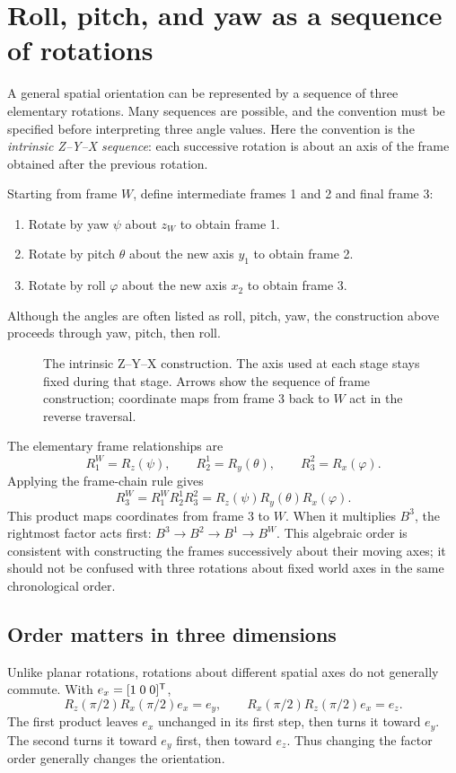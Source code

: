 \section{Roll, pitch, and yaw as a sequence of rotations}
A general spatial orientation can be represented by a sequence of three
elementary rotations. Many sequences are possible, and the convention must
be specified before interpreting three angle values. Here the convention is
the \emph{intrinsic Z--Y--X sequence}: each successive rotation is about an
axis of the frame obtained after the previous rotation.

Starting from frame $W$, define intermediate frames 1 and 2 and final frame 3:
\begin{enumerate}
 \item Rotate by yaw $\psi$ about $z_W$ to obtain frame 1.
 \item Rotate by pitch $\theta$ about the new axis $y_1$ to obtain frame 2.
 \item Rotate by roll $\varphi$ about the new axis $x_2$ to obtain frame 3.
\end{enumerate}
Although the angles are often listed as roll, pitch, yaw, the construction
above proceeds through yaw, pitch, then roll.

\begin{figure}[htbp]
\centering
\caption{The intrinsic Z--Y--X construction. The axis used at each stage stays
fixed during that stage. Arrows show the sequence of frame construction;
coordinate maps from frame 3 back to $W$ act in the reverse traversal.}
\label{fig:l04-sequence}
\end{figure}

The elementary frame relationships are
\[
 R_1^W=R_z(\psi),\qquad R_2^1=R_y(\theta),\qquad R_3^2=R_x(\varphi).
\]
Applying the frame-chain rule gives
\begin{equation}
 \boxed{R_3^W=R_1^W R_2^1 R_3^2
 =R_z(\psi)R_y(\theta)R_x(\varphi).}
 \label{eq:l04-rpy}
\end{equation}
This product maps coordinates from frame 3 to $W$. When it multiplies $B^3$,
the rightmost factor acts first: $B^3\to B^2\to B^1\to B^W$. This algebraic
order is consistent with constructing the frames successively about their
moving axes; it should not be confused with three rotations about fixed world
axes in the same chronological order.

\subsection{Order matters in three dimensions}
Unlike planar rotations, rotations about different spatial axes do not
generally commute. With $e_x=[1\;0\;0]^{\mathsf T}$,
\[
 R_z(\pi/2)R_x(\pi/2)e_x=e_y,\qquad
 R_x(\pi/2)R_z(\pi/2)e_x=e_z.
\]
The first product leaves $e_x$ unchanged in its first step, then turns it
toward $e_y$. The second turns it toward $e_y$ first, then toward $e_z$.
Thus changing the factor order generally changes the orientation.

